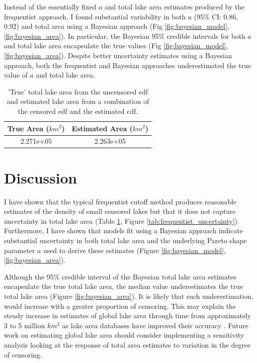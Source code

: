 \documentclass{article}
\begin{document}
Instead of the essentially fixed $a$ and total lake area estimates produced by the frequentist approach, I found substantial variability in both $a$ (95\% CI: 0.86, 0.92) and total area using a Bayesian approach (Fig \ref{fig:bayesian_model}, \ref{fig:bayesian_area}). In particular, the Bayesian 95\% credible intervals for both $a$ and total lake area encapsulate the true values (Fig \ref{fig:bayesian_model}, \ref{fig:bayesian_area}). Despite better uncertainty estimates using a Bayesian approach, both the frequentist and Bayesian approaches underestimated the true value of $a$ and total lake area.

\begin{table}
	\caption{'True' total lake area from the uncensored edf and estimated lake area from a combination of the censored edf and the estimated cdf.}
	\centering
	\begin{tabular}{cc}
		\toprule
		True Area ($km^2$) & Estimated Area ($km^2$) \\
		\midrule
		2.271e+05          & 2.263e+05               \\
		\bottomrule
	\end{tabular}
	\label{tab:pred_table}
\end{table}

\section{Discussion}

I have shown that the typical frequentist cutoff method produces reasonable estimates of the density of small censored lakes but that it does not capture uncertainty in total lake area (Table \ref{tab:pred_table}, Figure \ref{tab:frequentist_uncertainty}). Furthermore, I have shown that models fit using a Bayesian approach indicate substantial uncertainty in both total lake area and the underlying Pareto shape parameter $a$ used to derive these estimates (Figure \ref{fig:bayesian_model}, \ref{fig:bayesian_area}).

Although the 95\% credible interval of the Bayesian total lake area estimates encapsulate the true total lake area, the median value underestimates the true total lake area (Figure \ref{fig:bayesian_area}). It is likely that such underestimation, would increase with a greater proportion of censoring. This may explain the steady increase in estimates of global lake area through time from approximately 3 to 5 million $km^{2}$ as lake area databases have improved their accuracy \citep{lehnerDevelopmentValidationGlobal2004, downingGlobalAbundanceSize2006, verpoorterGlobalInventoryLakes2014}. Future work on estimating global lake area should consider implementing a sensitivity analysis looking at the response of total area estimates to variation in the degree of censoring.
\end{document}
